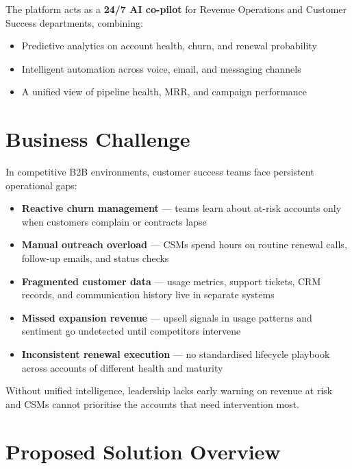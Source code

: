 \documentclass[11pt,a4paper]{article}
\begin{document}
The platform acts as a \textbf{24/7 AI co-pilot} for Revenue Operations and Customer Success departments, combining:
\begin{itemize}[leftmargin=1.5em, itemsep=0.2em]
    \item Predictive analytics on account health, churn, and renewal probability
    \item Intelligent automation across voice, email, and messaging channels
    \item A unified view of pipeline health, MRR, and campaign performance
\end{itemize}

\section{Business Challenge}

In competitive B2B environments, customer success teams face persistent operational gaps:

\begin{itemize}[leftmargin=1.5em, itemsep=0.3em]
    \item \textbf{Reactive churn management} --- teams learn about at-risk accounts only when customers complain or contracts lapse
    \item \textbf{Manual outreach overload} --- CSMs spend hours on routine renewal calls, follow-up emails, and status checks
    \item \textbf{Fragmented customer data} --- usage metrics, support tickets, CRM records, and communication history live in separate systems
    \item \textbf{Missed expansion revenue} --- upsell signals in usage patterns and sentiment go undetected until competitors intervene
    \item \textbf{Inconsistent renewal execution} --- no standardised lifecycle playbook across accounts of different health and maturity
\end{itemize}

Without unified intelligence, leadership lacks early warning on revenue at risk and CSMs cannot prioritise the accounts that need intervention most.

\section{Proposed Solution Overview}
\end{document}
